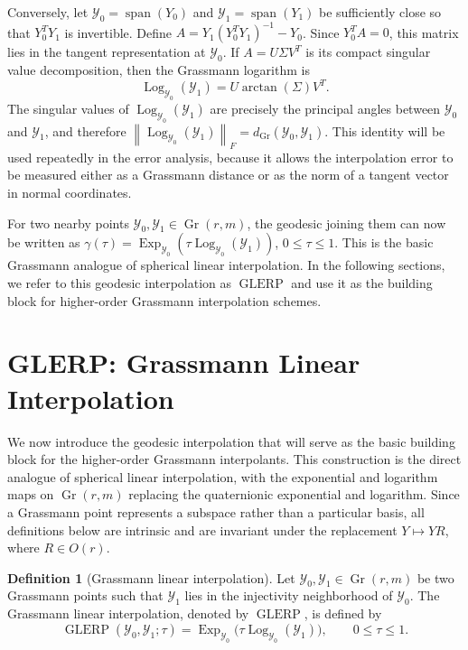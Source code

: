 \documentclass[a4paper,11pt]{article}
\newcommand{\Log}{\operatorname{Log}}
\newcommand{\Exp}{\operatorname{Exp}}
\DeclareMathOperator{\Gr}{Gr}
\DeclareMathOperator{\spanop}{span}
\newcommand{\cY}{\mathcal{Y}}
\newcommand{\norm}[1]{\left\lVert #1 \right\rVert}
\newcommand{\GLERP}{\operatorname{GLERP}}
\numberwithin{equation}{section}
\theoremstyle{plain}
\theoremstyle{definition}
\newtheorem{definition}[thm]{Definition}
\theoremstyle{remark}
\begin{document}
Conversely, let \(\cY_0=\spanop(Y_0)\) and \(\cY_1=\spanop(Y_1)\) be sufficiently close so that \(Y_0^TY_1\) is invertible. Define \(A=Y_1(Y_0^TY_1)^{-1}-Y_0\). Since \(Y_0^TA=0\), this matrix lies in the tangent representation at \(\cY_0\). If \(A=U\Sigma V^T\) is its compact singular value decomposition, then the Grassmann logarithm is
\[
    \Log_{\cY_0}(\cY_1)=U\arctan(\Sigma)V^T.
\]
The singular values of \(\Log_{\cY_0}(\cY_1)\) are precisely the principal angles between \(\cY_0\) and \(\cY_1\), and therefore \(\norm{\Log_{\cY_0}(\cY_1)}_F=d_{\Gr}(\cY_0,\cY_1)\). This identity will be used repeatedly in the error analysis, because it allows the interpolation error to be measured either as a Grassmann distance or as the norm of a tangent vector in normal coordinates.

For two nearby points \(\cY_0,\cY_1\in\Gr(r,m)\), the geodesic joining them can now be written as \(\gamma(\tau)=\Exp_{\cY_0}(\tau\Log_{\cY_0}(\cY_1))\), \(0\le \tau\le 1\). This is the basic Grassmann analogue of spherical linear interpolation. In the following sections, we refer to this geodesic interpolation as \(\GLERP\) and use it as the building block for higher-order Grassmann interpolation schemes.



\section{GLERP: Grassmann Linear Interpolation}\label{sec:glerp}

We now introduce the geodesic interpolation that will serve as the basic building block for the higher-order Grassmann interpolants. This construction is the direct analogue of spherical linear interpolation, with the exponential and logarithm maps on \(\Gr(r,m)\) replacing the quaternionic exponential and logarithm. Since a Grassmann point represents a subspace rather than a particular basis, all definitions below are intrinsic and are invariant under the replacement \(Y\mapsto YR\), where \(R\in O(r)\).

\begin{definition}[Grassmann linear interpolation]\label{def:glerp}
Let \(\mathcal{Y}_0,\mathcal{Y}_1\in\Gr(r,m)\) be two Grassmann points such that \(\mathcal{Y}_1\) lies in the injectivity neighborhood of \(\mathcal{Y}_0\). The Grassmann linear interpolation, denoted by \(\GLERP\), is defined by
\[
    \GLERP(\mathcal{Y}_0,\mathcal{Y}_1;\tau)
    =
    \Exp_{\mathcal{Y}_0}\bigl(\tau\Log_{\mathcal{Y}_0}(\mathcal{Y}_1)\bigr),
    \qquad 0\le \tau\le 1.
\]
\end{definition}
\end{document}
